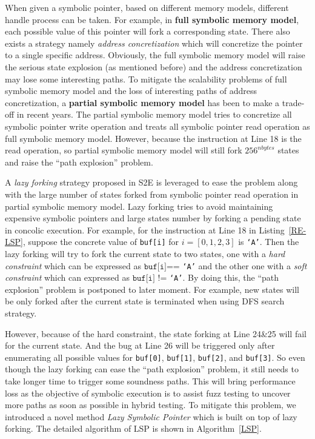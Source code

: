 When given a symbolic pointer, based on different memory models, different handle process can be taken. For example, in \textbf{full symbolic memory model}, each possible value of this pointer will fork a corresponding state. There also exists a strategy namely \textit{address concretization} which will concretize the pointer to a single specific address. Obviously, the full symbolic memory model will raise the serious state explosion (as mentioned before) and the address concretization may lose some interesting paths. To mitigate the scalability problems of full symbolic memory model and the loss of interesting paths of address concretization, a \textbf{partial symbolic memory model} has been to make a trade-off in recent years. The partial symbolic memory model tries to concretize all symbolic pointer write operation and treats all symbolic pointer read operation as full symbolic memory model. However, because the instruction at Line 18 is the read operation, so partial symbolic memory model will still fork $256^{nbytes}$ states and raise the ``path explosion'' problem.

A \textit{lazy forking} strategy proposed in S2E is leveraged to ease the problem along with the large number of states forked from symbolic pointer read operation in partial symbolic memory model. 
Lazy forking tries to avoid maintaining expensive symbolic pointers and large states number by forking a pending state in concolic execution. 
For example, for the instruction at Line 18 in Listing~\ref{RE-LSP}, suppose the concrete value of \texttt{buf[i]} for $i=[0,1,2,3]$ is \texttt{`A'}. Then the lazy forking will try to fork the current state to two states, one with a \textit{hard constraint} which can be expressed as $\texttt{buf[i]}$== \texttt{`A'} and the other one with a \textit{soft constraint} which can expressed as $\texttt{buf[i]}$ != \texttt{`A'}.
By doing this, the ``path explosion'' problem is postponed to later moment. For example, new states will be only forked after the current state is terminated when using DFS search strategy.


However, because of the hard constraint, the state forking at Line 24\&25 will fail for the current state. And the bug at Line 26 will be triggered only after enumerating all possible values for \texttt{buf[0]}, \texttt{buf[1]}, \texttt{buf[2]}, and \texttt{buf[3]}. So even though the lazy forking can ease the ``path explosion'' problem, it still needs to take longer time to trigger some soundness paths. This will bring performance loss as the objective of symbolic execution is to assist fuzz testing to uncover more paths as soon as possible in hybrid testing. 
To mitigate this problem, we introduced a novel method \emph{Lazy Symbolic Pointer} which is built on top of lazy forking. The detailed algorithm of LSP is shown in Algorithm~\ref{LSP}.

